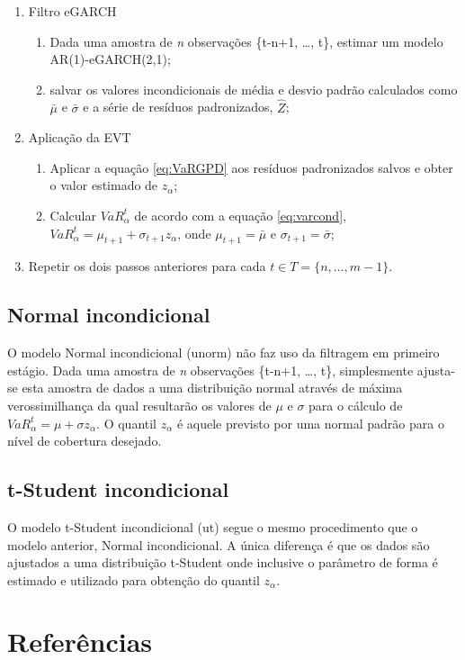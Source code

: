 \documentclass[1p]{elsarticle}
\theoremstyle{definition}
\begin{document}
\begin{enumerate}
	\item Filtro eGARCH
	\begin{enumerate}[label*=\arabic*.]
		\item Dada uma amostra de \emph{n} observações \{t-n+1, \ldots, t\}, estimar um modelo AR(1)-eGARCH(2,1);
		\item salvar os valores incondicionais de média e desvio padrão calculados como $\bar{\mu}$ e $\bar{\sigma}$ e a série de resíduos padronizados, $\hat{Z}$;
	\end{enumerate}
	
	\item Aplicação da EVT
	\begin{enumerate}[label*=\arabic*.]
		\item Aplicar a equação \eqref{eq:VaRGPD} aos resíduos padronizados salvos e obter o valor estimado de $z_\alpha$;
		\item Calcular $VaR^t_\alpha$ de acordo com a equação \eqref{eq:varcond}, $VaR_\alpha^t=\mu_{t+1}+\sigma_{t+1}z_\alpha$, onde $\mu_{t+1} = \bar{\mu}$ e $\sigma_{t+1} = \bar{\sigma}$;
	\end{enumerate}
	\item Repetir os dois passos anteriores para cada $t \in T = \{n, \ldots, m-1\}$.
\end{enumerate}

\subsection{Normal incondicional}

O modelo Normal incondicional (unorm) não faz uso da filtragem em primeiro estágio. Dada uma amostra de \emph{n} observações \{t-n+1, \ldots, t\}, simplesmente ajusta-se esta amostra de dados a uma distribuição normal através de máxima verossimilhança da qual resultarão os valores de $\mu$ e $\sigma$ para o cálculo de $VaR^t_\alpha=\mu+\sigma z_\alpha$. O quantil $z_\alpha$ é aquele previsto por uma normal padrão para o nível de cobertura desejado. 

\subsection{t-Student incondicional}

O modelo t-Student incondicional (ut) segue o mesmo procedimento que o modelo anterior, Normal incondicional. A única diferença é que os dados são ajustados a uma distribuição t-Student onde inclusive o parâmetro de forma é estimado e utilizado para obtenção do quantil $z_\alpha$.

\section*{Referências}


\end{document}
